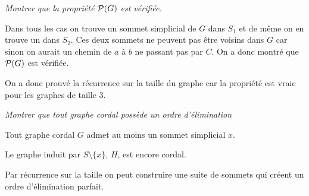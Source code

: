 \begin{Exercise}\it
Montrer que la propriété ${\cal P}(G)$ est vérifiée.
\end{Exercise}  
\begin{Answer}
Dans tous les cas on trouve un sommet simplicial de $G$ dans $S_1$ et de même on en trouve un dans $S_2$. Ces deux sommets ne peuvent pas être voisins dans $G$ car sinon on aurait un chemin de $a$ à $b$ ne passant pas par $C$. On a donc montré que ${\cal P}(G)$ est vérifiée. 

On a donc prouvé la récurrence sur la taille du graphe car la propriété est vraie pour les graphes de taille 3.
\end{Answer}
\begin{Exercise}\it
Montrer que tout graphe cordal possède un ordre d'élimination
\end{Exercise}  
\begin{Answer}
Tout graphe cordal $G$ admet au moins un sommet simplicial $x$. 

Le graphe induit par $S\setminus\{x\}$, $H$, est encore cordal.

Par récurrence sur la taille on peut construire une suite de sommets qui créent  un ordre d'élimination parfait.
\end{Answer}
